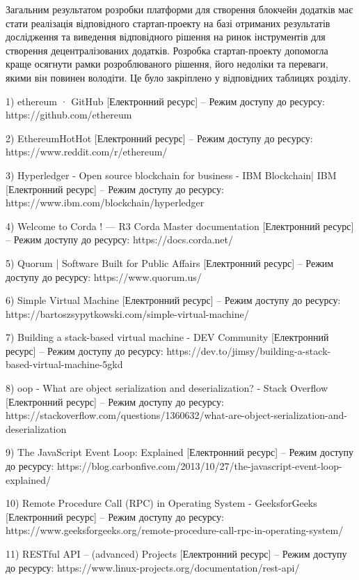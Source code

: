 \documentclass{lib/styles/default-style}
\begin{document}
    Загальним результатом розробки платформи для створення
    блокчейн додатків має стати реалізація відповідного стартап-проекту на базі отриманих
    результатів дослідження та виведення відповідного рішення на ринок
    інструментів для створення децентралізованих додатків. Розробка стартап-проекту допомогла
    краще осягнути рамки розроблюваного рішення, його недоліки та переваги,
    якими він повинен володіти. Це було закріплено у відповідних таблицях
    розділу.

    1) ethereum · GitHub [Електронний ресурс] – Режим доступу до ресурсу: https://github.com/ethereum
    
    2) EthereumHotHot [Електронний ресурс] – Режим доступу до ресурсу: https://www.reddit.com/r/ethereum/

    3) Hyperledger - Open source blockchain for business - IBM Blockchain| IBM [Електронний ресурс] – Режим доступу до ресурсу: https://www.ibm.com/blockchain/hyperledger

    4) Welcome to Corda ! — R3 Corda Master documentation [Електронний ресурс] – Режим доступу до ресурсу: https://docs.corda.net/

    5) Quorum | Software Built for Public Affairs [Електронний ресурс] – Режим доступу до ресурсу: https://www.quorum.us/

    6) Simple Virtual Machine [Електронний ресурс] – Режим доступу до ресурсу: https://bartoszsypytkowski.com/simple-virtual-machine/

    7) Building a stack-based virtual machine - DEV Community [Електронний ресурс] – Режим доступу до ресурсу: https://dev.to/jimsy/building-a-stack-based-virtual-machine-5gkd

    8) oop - What are object serialization and deserialization? - Stack Overflow [Електронний ресурс] – Режим доступу до ресурсу: https://stackoverflow.com/questions/1360632/what-are-object-serialization-and-deserialization

    9) The JavaScript Event Loop: Explained [Електронний ресурс] – Режим доступу до ресурсу: https://blog.carbonfive.com/2013/10/27/the-javascript-event-loop-explained/

    10) Remote Procedure Call (RPC) in Operating System - GeeksforGeeks [Електронний ресурс] – Режим доступу до ресурсу: https://www.geeksforgeeks.org/remote-procedure-call-rpc-in-operating-system/

    11) RESTful API – (advanced) Projects [Електронний ресурс] – Режим доступу до ресурсу: https://www.linux-projects.org/documentation/rest-api/
\end{document}
